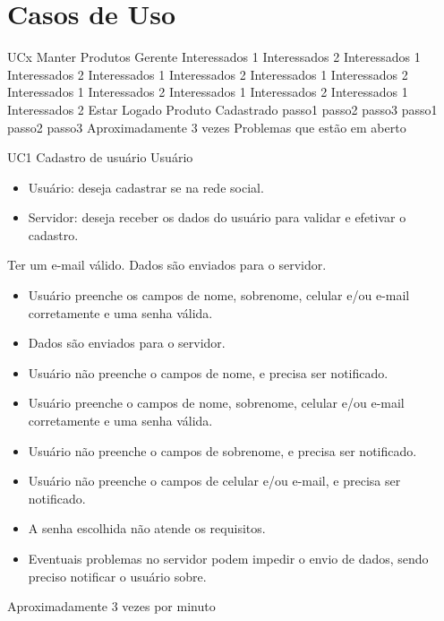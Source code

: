 \chapter{Casos de Uso}

\casoDeUso
{UCx}
{Manter Produtos}
{Gerente}
{
Interessados 1 Interessados 2
Interessados 1 Interessados 2
Interessados 1 Interessados 2
Interessados 1 Interessados 2
Interessados 1 Interessados 2
Interessados 1 Interessados 2
Interessados 1 Interessados 2
}
{Estar Logado}
{Produto Cadastrado}
{
passo1
passo2
passo3
}
{
passo1
passo2
passo3
}
{Aproximadamente 3 vezes}
{
Problemas que estão em aberto
}



\casoDeUso
{UC1}
{Cadastro de usuário}
{Usuário}
{
\begin{itemize}
	\item Usuário: deseja cadastrar se na rede social.
	\item Servidor: deseja receber os dados do usuário para validar e efetivar o cadastro.
\end{itemize}

}
{Ter um e-mail válido.}
{Dados são enviados para o servidor.}
{
\begin{itemize}
\item Usuário preenche os campos de nome, sobrenome,  celular e/ou e-mail corretamente e uma senha válida.
\item Dados são enviados para o servidor.
\end{itemize}
}
{
\begin{itemize}
\item Usuário não preenche o campos de nome, e precisa ser notificado.
\item Usuário preenche o campos de nome, sobrenome,  celular e/ou e-mail corretamente e uma senha válida.


\item Usuário não preenche o campos de sobrenome, e precisa ser notificado.

\item Usuário não preenche o campos de celular e/ou e-mail, e precisa ser notificado.

\item A senha escolhida não atende os requisitos.

\item Eventuais problemas no servidor podem impedir o envio de dados, sendo preciso notificar o usuário sobre.
\end{itemize}
}
{Aproximadamente 3 vezes por minuto}
{

}

